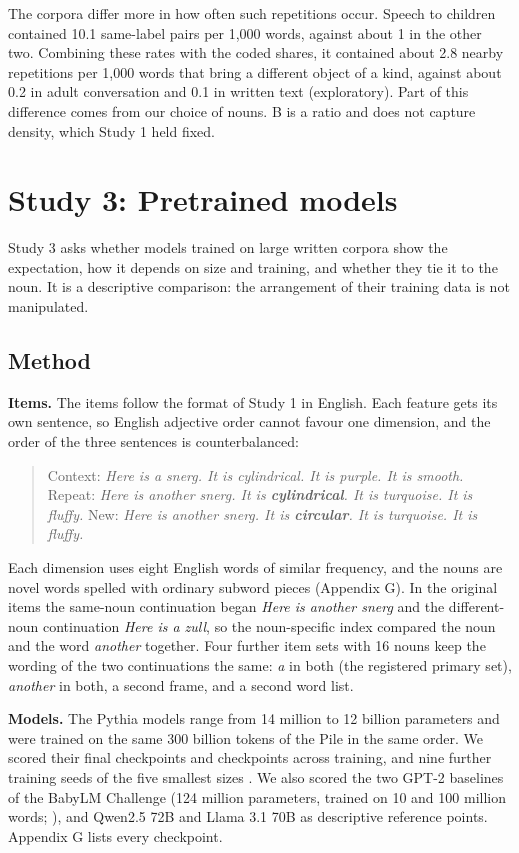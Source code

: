 The corpora differ more in how often such repetitions occur. Speech to children contained 10.1 same-label pairs per 1,000 words, against about 1 in the other two. Combining these rates with the coded shares, it contained about 2.8 nearby repetitions per 1,000 words that bring a different object of a kind, against about 0.2 in adult conversation and 0.1 in written text (exploratory). Part of this difference comes from our choice of nouns. B is a ratio and does not capture density, which Study 1 held fixed.

\section{Study 3: Pretrained models}
Study 3 asks whether models trained on large written corpora show the expectation, how it depends on size and training, and whether they tie it to the noun. It is a descriptive comparison: the arrangement of their training data is not manipulated.

\subsection{Method}
\textbf{Items.} The items follow the format of Study 1 in English. Each feature gets its own sentence, so English adjective order cannot favour one dimension, and the order of the three sentences is counterbalanced:

\begin{quote}
Context: \emph{Here is a snerg. It is cylindrical. It is purple. It is smooth.} Repeat: \emph{Here is another snerg. It is \textbf{cylindrical}. It is turquoise. It is fluffy.} New: \emph{Here is another snerg. It is \textbf{circular}. It is turquoise. It is fluffy.}
\end{quote}

Each dimension uses eight English words of similar frequency, and the nouns are novel words spelled with ordinary subword pieces (Appendix G). In the original items the same-noun continuation began \emph{Here is another snerg} and the different-noun continuation \emph{Here is a zull}, so the noun-specific index compared the noun and the word \emph{another} together. Four further item sets with 16 nouns keep the wording of the two continuations the same: \emph{a} in both (the registered primary set), \emph{another} in both, a second frame, and a second word list.

\textbf{Models.} The Pythia models \cite{biderman2023,vanderwal2025} range from 14 million to 12 billion parameters and were trained on the same 300 billion tokens of the Pile in the same order. We scored their final checkpoints and checkpoints across training, and nine further training seeds of the five smallest sizes \cite{vanderwal2025}. We also scored the two GPT-2 baselines of the BabyLM Challenge (124 million parameters, trained on 10 and 100 million words; \citealp{charpentier2025}), and Qwen2.5 72B \cite{qwen2024} and Llama 3.1 70B \cite{grattafiori2024} as descriptive reference points. Appendix G lists every checkpoint.

